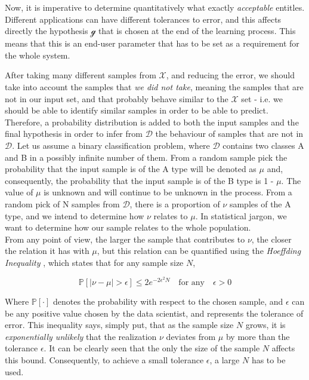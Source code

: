 Now, it is imperative to determine quantitatively what exactly \emph{acceptable} entitles. Different applications can have different tolerances to error, and this affects directly the hypothesis \( \mathcal{g}\) that is chosen at the end of the learning process. This means that this is an end-user parameter that has to be set as a requirement for the whole system.

After taking many different samples from \( \mathcal{X} \), and reducing the error, we should take into account the samples that \emph{we did not take}, meaning the samples that are not in our input set, and that probably behave similar to the \( \mathcal{X} \) set - i.e. we should be able to identify similar samples in order to be able to predict. Therefore, a probability distribution is added to both the input samples and the final hypothesis in order to infer from \( \mathcal{D} \) the behaviour of samples that are not in \( \mathcal{D} \). Let us assume a binary classification problem, where \( \mathcal{D} \) contains two classes A and B in a possibly infinite number of them. From a random sample pick the probability that the input sample is of the A type will be denoted as \(\mu\) and, consequently, the probability that the input sample is of the B type is 1 - \(\mu\). The value of \(\mu\) is unknown and will continue to be unknown in the process. From a random pick of N samples from \( \mathcal{D} \), there is a proportion of \(\nu\) samples of the A type, and we intend to determine how \(\nu\) relates to \(\mu\). In statistical jargon, we want to determine how our sample relates to the whole population. \\

From any point of view, the larger the sample that contributes to \(\nu\), the closer the relation it has with \(\mu\), but this relation can be quantified using the \emph{Hoeffding Inequality} \cite{Hoeffding1963}, which states that for any sample size \(N\),

\[\mathbb{P}[|\nu -\mu|>\epsilon ]\leq 2e^{-2\epsilon^{2}N} \quad \text{for any}\quad \epsilon>0\]

Where \(\mathbb{P}[\cdot]\) denotes the probability with respect to the chosen sample, and \(\epsilon\) can be any positive value chosen by the data scientist, and represents the tolerance of error. This inequality says, simply put, that as the sample size \(N\) grows, it is \emph{exponentially unlikely} that the realization \(\nu\) deviates from \(\mu\) by more than the tolerance \(\epsilon\). It can be clearly seen that the only the size of the sample \(N\) affects this bound. Consequently, to achieve a small tolerance \(\epsilon\), a large \(N\) has to be used.\\

